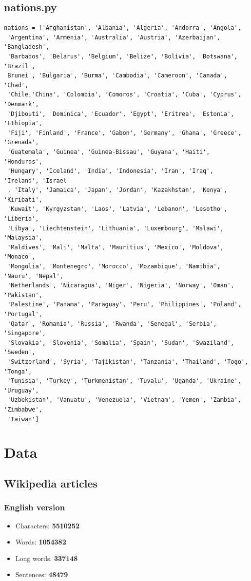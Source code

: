 \documentclass[a4paper]{article}
\begin{document}
\subsection{nations.py}
\begin{verbatim}
nations = ['Afghanistan', 'Albania', 'Algeria', 'Andorra', 'Angola', 
 'Argentina', 'Armenia', 'Australia', 'Austria', 'Azerbaijan', 'Bangladesh',
 'Barbados', 'Belarus', 'Belgium', 'Belize', 'Bolivia', 'Botswana', 'Brazil',
 Brunei', 'Bulgaria', 'Burma', 'Cambodia', 'Cameroon', 'Canada', 'Chad', 
 'Chile,'China', 'Colombia', 'Comoros', 'Croatia', 'Cuba', 'Cyprus', 'Denmark',
 'Djibouti', 'Dominica', 'Ecuador', 'Egypt', 'Eritrea', 'Estonia', 'Ethiopia', 
 'Fiji', 'Finland', 'France', 'Gabon', 'Germany', 'Ghana', 'Greece', 'Grenada', 
 'Guatemala', 'Guinea', 'Guinea-Bissau', 'Guyana', 'Haiti', 'Honduras', 
 'Hungary', 'Iceland', 'India', 'Indonesia', 'Iran', 'Iraq', 'Ireland', 'Israel
 , 'Italy', 'Jamaica', 'Japan', 'Jordan', 'Kazakhstan', 'Kenya', 'Kiribati', 
 'Kuwait', 'Kyrgyzstan', 'Laos', 'Latvia', 'Lebanon', 'Lesotho', 'Liberia', 
 'Libya', 'Liechtenstein', 'Lithuania', 'Luxembourg', 'Malawi', 'Malaysia', 
 'Maldives', 'Mali', 'Malta', 'Mauritius', 'Mexico', 'Moldova', 'Monaco', 
 'Mongolia', 'Montenegro', 'Morocco', 'Mozambique', 'Namibia', 'Nauru', 'Nepal',
 'Netherlands', 'Nicaragua', 'Niger', 'Nigeria', 'Norway', 'Oman', 'Pakistan', 
 'Palestine', 'Panama', 'Paraguay', 'Peru', 'Philippines', 'Poland', 'Portugal',
 'Qatar', 'Romania', 'Russia', 'Rwanda', 'Senegal', 'Serbia', 'Singapore',
 'Slovakia', 'Slovenia', 'Somalia', 'Spain', 'Sudan', 'Swaziland', 'Sweden',
 'Switzerland', 'Syria', 'Tajikistan', 'Tanzania', 'Thailand', 'Togo', 'Tonga',
 'Tunisia', 'Turkey', 'Turkmenistan', 'Tuvalu', 'Uganda', 'Ukraine', 'Uruguay',
 'Uzbekistan', 'Vanuatu', 'Venezuela', 'Vietnam', 'Yemen', 'Zambia', 'Zimbabwe',
 'Taiwan']
\end{verbatim} 

\newpage
\section{Data}
\subsection{Wikipedia articles}
\subsubsection{English version}
\begin{itemize}
	\item Characters: \textbf{5510252}
	\item Words: \textbf{1054382}
	\item Long words: \textbf{337148}
	\item Sentences: \textbf{48479}
\end{itemize}
\end{document}
